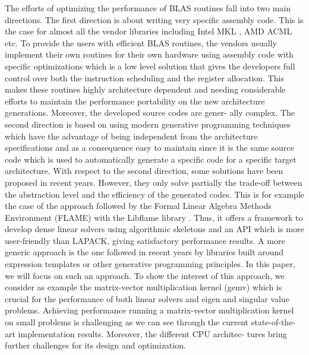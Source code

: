 \documentclass[../main]{subfiles}
\begin{document}
The efforts of optimizing the performance of BLAS routines
fall into two main directions. The first direction is about
writing very specific assembly code. This is the case for
almost all the vendor libraries including Intel MKL \cite{hpcs1},
AMD ACML \cite{hpcs2} etc. To provide the users with efficient BLAS
routines, the vendors usually implement their own routines
for their own hardware using assembly code with specific
optimizations which is a low level solution that gives the
developers full control over both the instruction scheduling
and the register allocation. This makes these routines highly
architecture dependent and needing considerable efforts to
maintain the performance portability on the new architecture
generations. Moreover, the developed source codes are gener-
ally complex. The second direction is based on using modern
generative programming techniques which have the advantage
of being independent from the architecture specifications and
as a consequence easy to maintain since it is the same source
code which is used to automatically generate a specific code
for a specific target architecture. With respect to the second
direction, some solutions have been proposed in recent years.
However, they only solve partially the trade-off between the
abstraction level and the efficiency of the generated codes.
This is for example the case of the approach followed by
the Formal Linear Algebra Methods Environment (FLAME)
with the Libflame library \cite{hpcs3}. Thus, it offers a framework to
develop dense linear solvers using algorithmic skeletons \cite{hpcs4}
and an API which is more user-friendly than LAPACK, giving
satisfactory performance results. A more generic approach is
the one followed in recent years by \cpp libraries built around
expression templates \cite{hpcs5} or other generative programming \cite{hpcs6}
principles. In this paper, we will focus on such an approach.
To show the interest of this approach, we consider as
example the matrix-vector multiplication kernel (gemv) which
is crucial for the performance of both linear solvers and eigen
and singular value problems. Achieving performance running
a matrix-vector multiplication kernel on small problems is
challenging as we can see through the current state-of-the-art
implementation results. Moreover, the different CPU architec-
tures bring further challenges for its design and optimization.
\end{document}
